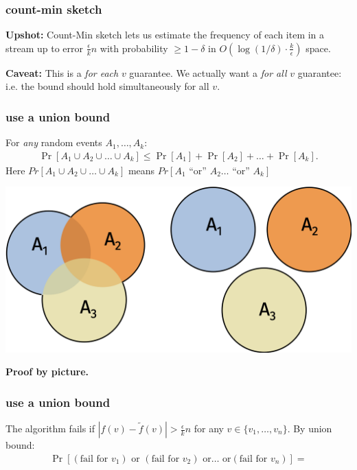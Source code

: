 \documentclass[]{beamer}
\begin{document}
	\begin{frame}
		\frametitle{count-min sketch}
		\textbf{Upshot:} Count-Min sketch lets us estimate the frequency of each item in a stream up to error $\frac{\epsilon}{k}n$ with probability $\ge 1-\delta$ in $O \left  (\log(1/\delta) \cdot \frac{k}{\epsilon} \right )$ space.
	
	\vspace{4em}
	\textbf{Caveat:} This is a \emph{for each} $v$ guarantee. We actually want a \emph{for all} $v$ guarantee: i.e. the bound should hold simultaneously for all $v$.
	\end{frame}

\begin{frame}
	\frametitle{use a union bound}
	\begin{lemma}
		For \emph{any} random events $A_1, \ldots, A_k$:
		\begin{align*}
			\Pr[A_1 \cup A_2 \cup \ldots \cup A_k] \leq \Pr[A_1] + \Pr[A_2] + \ldots +\Pr[A_k].
		\end{align*}
	Here $Pr[A_1 \cup A_2 \cup \ldots \cup A_k]$ means $Pr[A_1 \text{ ``or'' } A_2 \ldots \text{ ``or'' }  A_k]$
	\end{lemma}
	\begin{center}
		\includegraphics[width=.8\textwidth]{union_bound_proof.png}
		
		\textbf{Proof by picture.}
	\end{center}
\end{frame}

\begin{frame}
	\frametitle{use a union bound}
	The algorithm fails if $|f(v) - \tilde{f}(v)| > \frac{\epsilon}{k} n$ for any $v \in \{v_1, \ldots, v_n\}$. By union bound:
	\begin{align*}
		\Pr[(\text{fail for } v_1) \text{ or } (\text{fail for } v_2)  \text{ or}  \ldots  \text{ or}  (\text{fail for } v_n)] = 
	\end{align*}
	
\end{frame}
\end{document}

